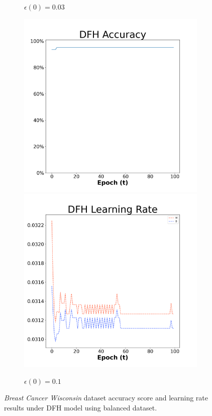 \begin{figure}[H]
\begin{subfigure}{0.3\textwidth}
  \caption{$\epsilon(0)=0.03$}
\end{subfigure}\hfil %
\begin{subfigure}{0.3\textwidth}
  \includegraphics[width=\linewidth]{images/exper1/breast/DFH_0.1_acc.png}
  \includegraphics[width=\linewidth]{images/exper1/breast/DFH_0.1_lr.png}
  \caption{$\epsilon(0)=0.1$}
\end{subfigure}

\caption{\textit{Breast Cancer Wisconsin} dataset accuracy score and learning rate results under DFH model using balanced dataset.}
\end{figure}


